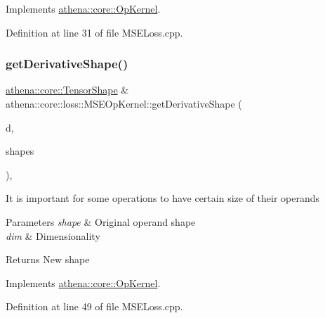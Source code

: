 Implements \mbox{\hyperlink{classathena_1_1core_1_1_op_kernel_ad500db1afc5a7c10acff8ecb8f1bee4d}{athena\+::core\+::\+Op\+Kernel}}.



Definition at line 31 of file M\+S\+E\+Loss.\+cpp.

\mbox{\label{classathena_1_1core_1_1loss_1_1_m_s_e_op_kernel_a68a0220e3a3591638c7725b5cb659609}} 
\subsubsection{\texorpdfstring{get\+Derivative\+Shape()}{getDerivativeShape()}}
{\footnotesize\ttfamily \mbox{\hyperlink{classathena_1_1core_1_1_tensor_shape}{athena\+::core\+::\+Tensor\+Shape}} \& athena\+::core\+::loss\+::\+M\+S\+E\+Op\+Kernel\+::get\+Derivative\+Shape (\begin{DoxyParamCaption}\item[{int}]{d,  }\item[{std\+::vector$<$ \mbox{\hyperlink{classathena_1_1core_1_1_tensor_shape}{athena\+::core\+::\+Tensor\+Shape}} $>$ \&}]{shapes }\end{DoxyParamCaption})\hspace{0.3cm}{\ttfamily [override]}, {\ttfamily [virtual]}}

It is important for some operations to have certain size of their operands 
\begin{DoxyParams}{Parameters}
{\em shape} & Original operand shape \\
\hline
{\em dim} & Dimensionality \\
\hline
\end{DoxyParams}
\begin{DoxyReturn}{Returns}
New shape 
\end{DoxyReturn}


Implements \mbox{\hyperlink{classathena_1_1core_1_1_op_kernel_ad95af6dd184ce7ee9182ec7ca54b6c4d}{athena\+::core\+::\+Op\+Kernel}}.



Definition at line 49 of file M\+S\+E\+Loss.\+cpp.

\mbox{\label{classathena_1_1core_1_1loss_1_1_m_s_e_op_kernel_ab851ee62ea95c3aab8aab2d28cfa9d04}} 
